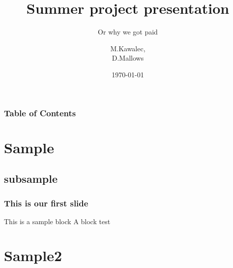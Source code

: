 \documentclass{beamer}
\title{Summer project presentation}
\subtitle{Or why we got paid}
\author{M.Kawalec, \\ D.Mallows}
\date{\today}
\begin{document}
  \frame{\titlepage}

  \begin{frame}
    \frametitle{Table of Contents}
    \tableofcontents
  \end{frame}

  \begin{frame}
    \section{Sample}
      \subsection{subsample}
    \frametitle{This is our first slide}
    \begin{block}{This is a sample block}
      A block test
    \end{block}
    \section{Sample2}
  \end{frame}
\end{document}
